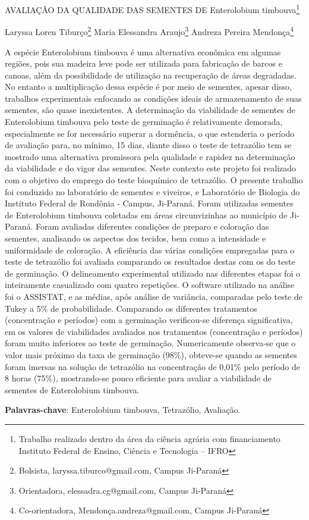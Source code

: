 \documentclass[article,12pt,onesidea,4paper,english,brazil]{abntex2}
\begin{document}
	
	
	\frenchspacing 
	
	\begin{center}
		\LARGE AVALIAÇÃO DA QUALIDADE DAS SEMENTES DE Enterolobium timbouva\footnote{Trabalho realizado dentro da área da ciência agrária com financiamento Instituto Federal de Ensino,
			Ciência e Tecnologia – IFRO}
		
		\normalsize
		Laryssa Loren Tiburço\footnote{Bolsista, laryssa.tiburco@gmail.com, Campus Ji-Paraná} 
		Maria Elessandra Araujo\footnote{Orientadora, elessadra.cg@gmail.com, Campus Ji-Paraná} 
	Andreza Pereira Mendonça\footnote{Co-orientadora, Mendonça.andreza@gmail.com, Campus Ji-Paraná} 
		 
	\end{center}
	
	\noindent A espécie Enterolobium timbouva é uma alternativa econômica em algumas regiões,
	pois sua madeira leve pode ser utilizada para fabricação de barcos e canoas, além
	da possibilidade de utilização na recuperação de áreas degradadas. No entanto a
	multiplicação dessa espécie é por meio de sementes, apesar disso, trabalhos
	experimentais enfocando as condições ideais de armazenamento de suas sementes,
	são quase inexistentes. A determinação da viabilidade de sementes de Enterolobium
	timbouva pelo teste de germinação é relativamente demorada, especialmente se for
	necessário superar a dormência, o que estenderia o período de avaliação para, no
	mínimo, 15 dias, diante disso o teste de tetrazólio tem se mostrado uma alternativa
	promissora pela qualidade e rapidez na determinação da viabilidade e do vigor das
	sementes. Neste contexto este projeto foi realizado com o objetivo do emprego do
	teste bioquímico de tetrazólio. O presente trabalho foi conduzido no laboratório de
	sementes e viveiros, e Laboratório de Biologia do Instituto Federal de Rondônia -
	Campus, Ji-Paraná. Foram utilizadas sementes de Enterolobium timbouva coletadas
	em áreas circunvizinhas ao município de Ji-Paraná. Foram avaliadas diferentes
	condições de preparo e coloração das sementes, analisando os aspectos dos
	tecidos, bem como a intensidade e uniformidade de coloração. A eficiência das
	várias condições empregadas para o teste de tetrazólio foi avaliada comparando os
	resultados destas com os do teste de germinação. O delineamento experimental
	utilizado nas diferentes etapas foi o inteiramente casualizado com quatro repetições.
	O software utilizado na análise foi o ASSISTAT, e as médias, após análise de
	variância, comparadas pelo teste de Tukey a 5\% de probabilidade. Comparando os
	diferentes tratamentos (concentração e períodos) com a germinação verificou-se
	diferença significativa, em os valores de viabilidades avaliados nos tratamentos
	(concentração e períodos) foram muito inferiores ao teste de germinação.
	Numericamente observa-se que o valor mais próximo da taxa de germinação (98\%),
	obteve-se quando as sementes foram imersas na solução de tetrazólio na
	concentração de 0,01\% pelo período de 8 horas (75\%), mostrando-se pouco
	eficiente para avaliar a viabilidade de sementes de Enterolobium timbouva.
	
	\vspace{\onelineskip}
	
	\noindent
	\textbf{Palavras-chave}: Enterolobium timbouva, Tetrazólio, Avaliação.
	
\end{document}
